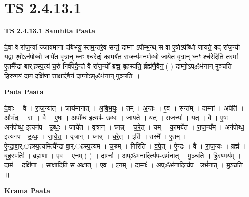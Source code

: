 \documentclass[17pt]{extarticle}
\begin{document}
\section*{ TS 2.4.13.1 }

\textbf{TS 2.4.13.1 } \newline
\textbf{Samhita Paata} \newline

दे॒वा वै रा॑ज॒न्या᳚-ज्जाय॑माना-दबिभयु॒-स्तम॒न्तरे॒व सन्तं॒ दाम्ना ऽपौ᳚म्भ॒न्थ् स वा ए॒षोऽपो᳚ब्धो जायते॒ यद्-रा॑ज॒न्यो॑ यद्वा ए॒षोऽन॑पोब्धो॒ जाये॑त वृ॒त्रान् घ्नꣳ श्च॑रे॒द्यं का॒मये॑त राज॒न्य॑मन॑पोब्धो जायेत वृ॒त्रान् घ्नꣳ श्च॑रे॒दिति॒ तस्मा॑ ए॒तमै᳚न्द्रा बार्.हस्प॒त्यं च॒रुं निर्व॑पेदै॒न्द्रो वै रा॑ज॒न्यो᳚ ब्रह्म॒ बृह॒स्पति॒ र्ब्रह्म॑णै॒वैनं॒ ( ) दाम्नो॒ऽप्ॐभ॑नान् मुञ्चति हिर॒ण्मयं॒ दाम॒ दक्षि॑णा सा॒क्षादे॒वैनं॒ दाम्नो॒ऽप्ॐभ॑नान् मुञ्चति ॥ \newline

\textbf{Pada Paata} \newline

दे॒वाः । वै । रा॒ज॒न्या᳚त् । जाय॑मानात् ।   अ॒बि॒भ॒युः॒ । तम् । अ॒न्तः । ए॒व । सन्त᳚म् ।   दाम्ना᳚ । अपेति॑ । औ॒भं॒न्न् । सः । वै । ए॒षः । अपो᳚ब्ध॒ इत्यप॑- उ॒ब्धः॒ । जा॒य॒ते॒ । यत् । रा॒ज॒न्यः॑ । यत् । वै । ए॒षः । अन॑पोब्ध॒ इत्यन॑प - उ॒ब्धः॒ । जाये॑त । वृ॒त्रान् । घ्नन्न् । च॒रे॒त् । यम् । का॒मये॑त । रा॒ज॒न्य᳚म् । अन॑पोब्ध॒ इत्यन॑प - उ॒ब्धः॒ । जा॒ये॒त॒ । वृ॒त्रान् । घ्नन्न् । च॒रे॒त् । इति॑ । तस्मै᳚ । ए॒तम् । ऐ॒न्द्रा॒बा॒र्.॒ह॒स्प॒त्यमित्यै᳚न्द्रा-बा॒र्.॒ह॒स्प॒त्यम् । च॒रुम् । निरिति॑ । व॒पे॒त् ।   ऐ॒न्द्रः । वै । रा॒ज॒न्यः॑ । ब्रह्म॑ । बृह॒स्पतिः॑ । ब्रह्म॑णा । ए॒व । ए॒न॒म् ( ) । दाम्नः॑ । अ॒प्ॐभ॑ना॒दित्य॑प-उभं॑नात् । मु॒ञ्च॒ति॒ । हि॒र॒ण्मय᳚म् । दाम॑ । दक्षि॑णा । सा॒क्षादिति॑ स-अ॒क्षात् । ए॒व । ए॒न॒म् । दाम्नः॑ । अ॒प्ॐभ॑ना॒दित्य॑प - उभं॑नात् । मु॒ञ्च॒ति॒ ॥  \newline


\textbf{Krama Paata} \newline
\end{document}
